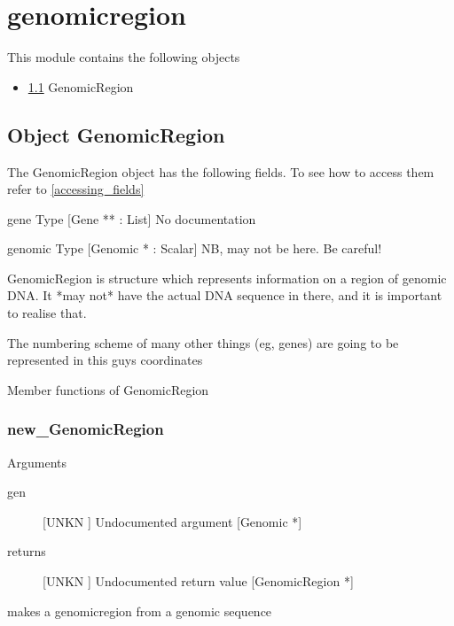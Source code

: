 \section{genomicregion}
\label{module_genomicregion}
This module contains the following objects

\begin{itemize}
\item \ref{object_GenomicRegion} GenomicRegion

\end{itemize}
\subsection{Object GenomicRegion}

\label{object_GenomicRegion}

The GenomicRegion object has the following fields. To see how to access them refer to \ref{accessing_fields}
\begin{description}
\item{gene} Type [Gene ** : List] No documentation

\item{genomic} Type [Genomic * : Scalar]  NB, may not be here. Be careful!

\end{description}
GenomicRegion is structure which represents
information on a region of genomic DNA. It
*may not* have the actual DNA sequence in there,
and it is important to realise that.


The numbering scheme of many other things (eg,
genes) are going to be represented in this 
guys coordinates




Member functions of GenomicRegion

\subsubsection{new_GenomicRegion}

Arguments
\begin{description}
\item[gen] [UNKN ] Undocumented argument [Genomic *]
\item[returns] [UNKN ] Undocumented return value [GenomicRegion *]
\end{description}
makes a genomicregion from a genomic sequence


